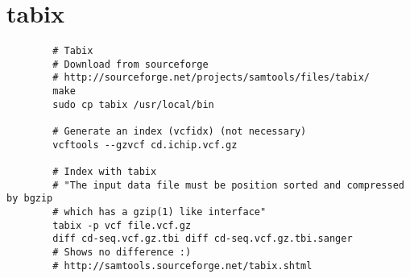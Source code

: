 \section{tabix}
\label{app:tabix}

\begin{listing}[H]
    \begin{verbatim}
        # Tabix
        # Download from sourceforge
        # http://sourceforge.net/projects/samtools/files/tabix/
        make
        sudo cp tabix /usr/local/bin

        # Generate an index (vcfidx) (not necessary)
        vcftools --gzvcf cd.ichip.vcf.gz

        # Index with tabix
        # "The input data file must be position sorted and compressed by bgzip 
        # which has a gzip(1) like interface"
        tabix -p vcf file.vcf.gz
        diff cd-seq.vcf.gz.tbi diff cd-seq.vcf.gz.tbi.sanger
        # Shows no difference :)
        # http://samtools.sourceforge.net/tabix.shtml
    \end{verbatim}
\end{listing}
